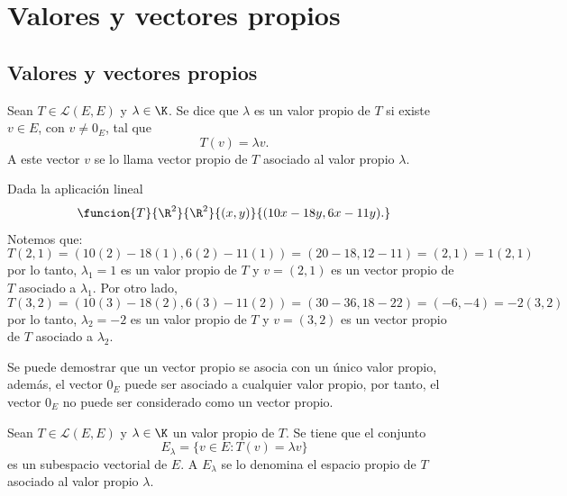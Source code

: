 \documentclass[compacto,10pt]{pubciencias-notas}
\begin{document}
\encabezado
\vspace*{-8mm}

\setcounter{section}{6}
\section{Valores y vectores propios}


\subsection{Valores y vectores propios}
\begin{defi}
Sean $T \in \mathscr{L}(E,E)$ y $\lambda \in\K$. Se dice que $\lambda$ es un valor propio de $T$ si existe $v\in E$, con $v\neq 0_{E}$, tal que
\[
    T(v) = \lambda v.
\]
A este vector $v$ se lo llama vector propio de $T$ asociado al valor propio $\lambda$.
\end{defi}



\begin{ejem}\hspace{0pt} Dada la aplicación lineal
\[
    \funcion{T}{\R^2}{\R^2}{(x,y)}{(10x-18y,6x-11y).}
\]
Notemos que:
\[
T(2,1) = (10(2) -18(1), 6(2) -11(1)) = (20-18,12-11)=(2,1) = 1 (2,1)
\]
por lo tanto, $\lambda_{1}=1$ es un valor propio de $T$ y $v=(2,1)$ es un vector propio de $T$ asociado a $\lambda_{1}$.
Por otro lado,
\[
T(3,2) = (10(3) -18(2), 6(3) -11(2)) = (30-36,18-22)=(-6,-4) = -2 (3,2)
\]
por lo tanto, $\lambda_{2}=-2$ es un valor propio de $T$ y $v=(3,2)$ es un vector propio de $T$ asociado a $\lambda_{2}$.

\end{ejem}


\begin{advertencia}
Se puede demostrar que un vector propio se asocia con un único valor propio, además, el vector $0_{E}$ puede ser asociado a cualquier valor propio, por tanto, el vector $0_{E}$ no puede ser considerado como un vector propio.
\end{advertencia}




\newpage
\begin{prop}
Sean $T \in \mathscr{L}(E,E)$ y $\lambda \in\K$ un valor propio de $T$. Se tiene que el conjunto
\[
    E_\lambda = \{ v\in E : T(v) = \lambda v\} 
\]
es un subespacio vectorial de $E$. A $E_{\lambda}$ se lo denomina el espacio propio de $T$ asociado al valor propio $\lambda$.
\end{prop}
\end{document}
